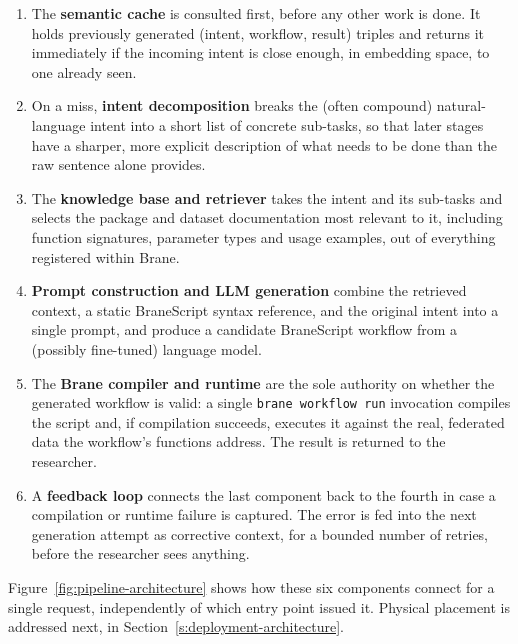 \begin{enumerate}
    \item The \textbf{semantic cache} is consulted first, before any other
        work is done. It holds previously generated (intent, workflow,
        result) triples and returns it immediately if the incoming intent
        is close enough, in embedding space, to one already seen.
    \item On a miss, \textbf{intent decomposition} breaks the (often
        compound) natural-language intent into a short list of concrete
        sub-tasks, so that later stages have a sharper, more explicit
        description of what needs to be done than the raw sentence alone
        provides.
    \item The \textbf{knowledge base and retriever} takes the intent and its
        sub-tasks and selects the package and dataset documentation most relevant to it, including
        function signatures, parameter types and usage examples, out of everything registered within Brane.
    \item \textbf{Prompt construction and LLM generation} combine the
        retrieved context, a static BraneScript syntax reference, and the
        original intent into a single prompt, and produce a candidate
        BraneScript workflow from a (possibly fine-tuned) language model.
    \item The \textbf{Brane compiler and runtime} are the sole authority on
        whether the generated workflow is valid: a single \texttt{brane
        workflow run} invocation compiles the script and, if compilation
        succeeds, executes it against the real, federated data the
        workflow's functions address. The result is returned to the researcher.
    \item A \textbf{feedback loop} connects the last component back to the
        fourth in case a compilation or runtime failure is captured. The error is fed into
        the next generation attempt as corrective context, for a bounded
        number of retries, before the researcher sees anything.
\end{enumerate}

Figure~\ref{fig:pipeline-architecture} shows how these six components
connect for a single request, independently of which entry point issued it.
Physical placement is addressed next, in Section~\ref{s:deployment-architecture}.

